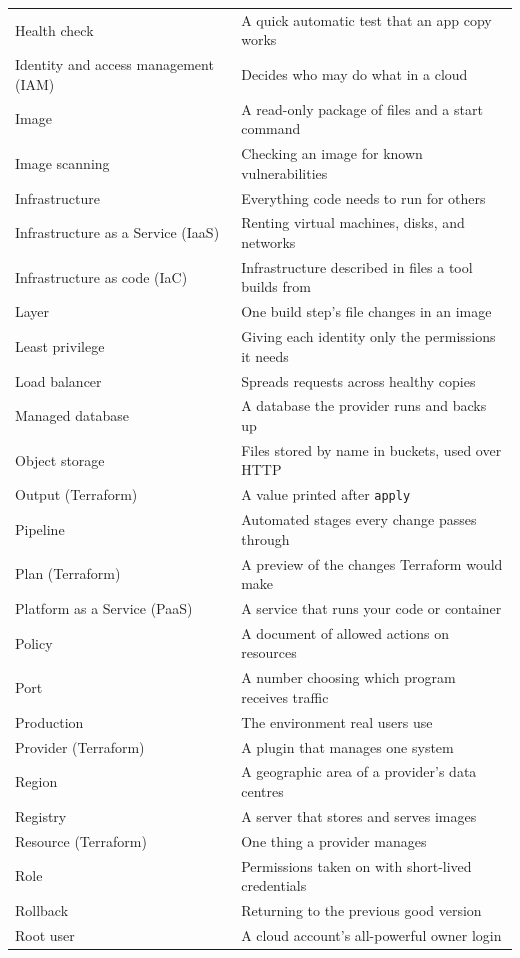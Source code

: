\begin{booktable}
\begin{longtable}{>{\raggedright\arraybackslash}p{}>{\raggedright\arraybackslash}p{}}
Health check & A quick automatic test that an app copy works \\
Identity and access management (IAM) & Decides who may do what in a cloud \\
Image & A read-only package of files and a start command \\
Image scanning & Checking an image for known vulnerabilities \\
Infrastructure & Everything code needs to run for others \\
Infrastructure as a Service (IaaS) & Renting virtual machines, disks, and networks \\
Infrastructure as code (IaC) & Infrastructure described in files a tool builds from \\
Layer & One build step's file changes in an image \\
Least privilege & Giving each identity only the permissions it needs \\
Load balancer & Spreads requests across healthy copies \\
Managed database & A database the provider runs and backs up \\
Object storage & Files stored by name in buckets, used over HTTP \\
Output (Terraform) & A value printed after \texttt{apply} \\
Pipeline & Automated stages every change passes through \\
Plan (Terraform) & A preview of the changes Terraform would make \\
Platform as a Service (PaaS) & A service that runs your code or container \\
Policy & A document of allowed actions on resources \\
Port & A number choosing which program receives traffic \\
Production & The environment real users use \\
Provider (Terraform) & A plugin that manages one system \\
Region & A geographic area of a provider's data centres \\
Registry & A server that stores and serves images \\
Resource (Terraform) & One thing a provider manages \\
Role & Permissions taken on with short-lived credentials \\
Rollback & Returning to the previous good version \\
Root user & A cloud account's all-powerful owner login \\

\end{longtable}
\end{booktable}
